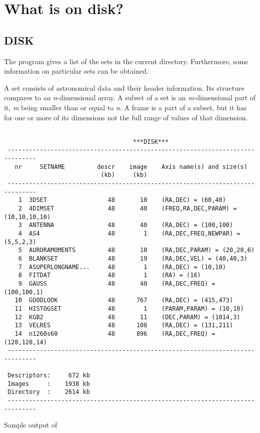 
\section{What is on disk?}

\subsection*{DISK}
\label{ssec-disk}

The program  gives a list of the sets in the current
directory.  Furthermore, some information on particular sets can be
obtained. 

  
A set consists of astronomical data and their header information.  Its
structure compares to an {\em n}-dimensional array.  A subset of a set
is an {\em m}-dimensional part of it, {\em m} being smaller than or
equal to {\em n}.  A frame is a part of a subset, but it has for one or
more of its dimensions not the full range of values of that dimension.


\begin{table}[tbh]
\begin{center}

\begin{verbatim}
   
                                    ***DISK***
 ------------------------------------------------------------------------------
   nr     SETNAME         descr    image    Axis name(s) and size(s)
                           (kb)     (kb)     
 ------------------------------------------------------------------------------
    1  3DSET                 48       10    (RA,DEC) = (60,40)
    2  4DIMSET               48       40    (FREQ,RA,DEC,PARAM) = (10,10,10,10)
    3  ANTENNA               48       40    (RA,DEC) = (100,100)
    4  AS4                   48        1    (RA,DEC,FREQ,NEWPAR) = (5,5,2,3)
    5  AURORAMOMENTS         48       10    (RA,DEC,PARAM) = (20,20,6)
    6  BLANKSET              48       19    (RA,DEC,VEL) = (40,40,3)
    7  ASUPERLONGNAME...     48        1    (RA,DEC) = (10,10)
    8  FITDAT                48        1    (RA) = (16)
    9  GAUSS                 48       40    (RA,DEC,FREQ) = (100,100,1)
   10  GOODLOOK              48      767    (RA,DEC) = (415,473)
   11  HISTOGSET             48        1    (PARAM,PARAM) = (10,10)
   12  KGB2                  48       11    (DEC,PARAM) = (1014,3)
   13  VELRES                48      108    (RA,DEC) = (131,211)
   14  n1260s60              48      896    (RA,DEC,FREQ) = (128,128,14)
 ------------------------------------------------------------------------------
   
 Descriptors:     672 kb
 Images     :    1938 kb
 Directory  :    2614 kb
 ------------------------------------------------------------------------------

\end{verbatim}

\caption{Sample output of  }

\label{tab:disk1}

\end{center}
\end{table}

